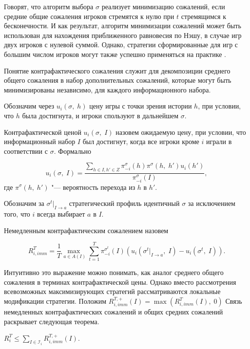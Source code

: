 Говорят, что алгоритм выбора $\sigma$ реализует минимизацию сожалений, если средние общие сожаления игроков стремятся к нулю при $t$ стремящимся к бесконечности. И как результат, алгоритм минимизации сожалений может быть использован для нахождения приближенного равновесия по Нэшу, в случае игр двух игроков с нулевой суммой. Однако, стратегии сформированные для игр с большим числом игроков могут также успешно применяться на практике \cite{aay2400}.

Понятие контрафактического сожаления служит для декомпозиции среднего общего сожаления в набор дополнительных сожалений, которые могут быть минимизированы независимо, для каждого информационного набора.  

Обозначим через $u_i(\sigma,\;h)$ цену игры с точки зрения истории $h$, при условии, что $h$ была достигнута, и игроки спользуют в дальнейшем $\sigma$. 

\begin{defin}
	Контрафактической ценой $u_i(\sigma,\;I)$ назовем ожидаемую цену, при условии, что информационный набор $I$ был достигнут, когда все игроки кроме $i$ играли в соответствии с $\sigma$. Формально 
\end{defin} 
\begin{equation}
	u_i(\sigma,\;I)=\frac{\sum_{h\in I,h'\in Z}\pi_{-i}^\sigma(h)\pi^\sigma(h,\;h')u_i(h')}{\pi_{-i}^\sigma(I)},
\end{equation}
где $\pi^\sigma(h,\;h')$ "--- вероятность перехода из $h$ в $h'$.

Обозначим за $\sigma^t |_{I \to a}$ стратегический профиль идентичный $\sigma$ за исключением того, что $i$ всегда выбирает $a$ в $I$. 

Немедленным контрафактическим сожалением назовем 

\begin{equation}\label{Sych_eq1}
	R_{i,imm}^T = \frac{1}{T}\underset{a\in A(I)}{\max\;}\sum_{t=1}^{T}\pi_{-i}^{\sigma^t}(I)(u_i(\sigma^t |_{I \to a},\;I)-u_i(\sigma^t,\;I)).
\end{equation}

Интуитивно это выражение можно понимать, как аналог среднего общего сожаления в терминах контрафактической цены. Однако вместо рассмотрения всевозможных максимизирующих стратегий рассматриваются локальные модификации стратегии. Положим $R_{i,imm}^{T,+}(I) = \max (R_{i,imm}^{T}(I),\;0)$ Связь немедленных контрафактических сожалений и общих средних сожалений раскрывает следующая теорема. 

\begin{theo} 
	$R_i^T \leq \sum_{I\in \mathcal{I}_i}R_{i,imm}^{T,+}(I)$.
\end{theo}

